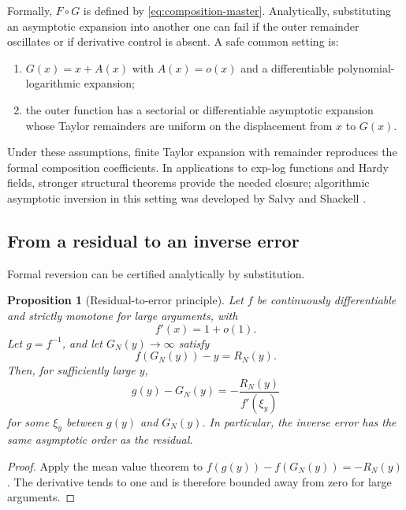 \documentclass[11pt]{article}
\theoremstyle{pltheorem}
\newtheorem{proposition}[theorem]{Proposition}
\newcommand{\compose}{\mathbin{\circ}}
\begin{document}
Formally, \(F\compose G\) is defined by \cref{eq:composition-master}.  Analytically, substituting an asymptotic expansion into another one can fail if the outer remainder oscillates or if derivative control is absent.  A safe common setting is:
\begin{enumerate}
\item \(G(x)=x+A(x)\) with \(A(x)=o(x)\) and a differentiable polynomial-logarithmic expansion;
\item the outer function has a sectorial or differentiable asymptotic expansion whose Taylor remainders are uniform on the displacement from \(x\) to \(G(x)\).
\end{enumerate}
Under these assumptions, finite Taylor expansion with remainder reproduces the formal composition coefficients.  In applications to exp-log functions and Hardy fields, stronger structural theorems provide the needed closure; algorithmic asymptotic inversion in this setting was developed by Salvy and Shackell \cite{salvy-shackell-1999}.

\subsection{From a residual to an inverse error}

Formal reversion can be certified analytically by substitution.

\begin{proposition}[Residual-to-error principle]\label{prop:residual-to-error}
Let \(f\) be continuously differentiable and strictly monotone for large arguments, with
\begin{equation}\label{eq:fprime-to-one}
 f'(x)=1+o(1).
\end{equation}
Let \(g=f^{-1}\), and let \(G_N(y)\to\infty\) satisfy
\begin{equation}\label{eq:inverse-residual-bound}
 f(G_N(y))-y=R_N(y).
\end{equation}
Then, for sufficiently large \(y\),
\begin{equation}\label{eq:inverse-error-bound}
 g(y)-G_N(y)=-\frac{R_N(y)}{f'(\xi_y)}
\end{equation}
for some \(\xi_y\) between \(g(y)\) and \(G_N(y)\).  In particular, the inverse error has the same asymptotic order as the residual.
\end{proposition}

\begin{proof}
Apply the mean value theorem to
\(f(g(y))-f(G_N(y))=-R_N(y)\).  The derivative tends to one and is therefore bounded away from zero for large arguments.
\end{proof}
\end{document}
